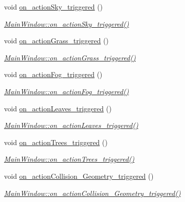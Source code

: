 \begin{DoxyCompactItemize}
void \hyperlink{class_main_window_aa4301fd4cad1597fad079ee7eebbd14a}{on\+\_\+action\+Sky\+\_\+triggered} ()
\begin{DoxyCompactList}\small\item\em \hyperlink{class_main_window_aa4301fd4cad1597fad079ee7eebbd14a}{Main\+Window\+::on\+\_\+action\+Sky\+\_\+triggered()} \end{DoxyCompactList}\item 
void \hyperlink{class_main_window_ac2ff07ecfb39bbcd9f863693bd3bb146}{on\+\_\+action\+Grass\+\_\+triggered} ()
\begin{DoxyCompactList}\small\item\em \hyperlink{class_main_window_ac2ff07ecfb39bbcd9f863693bd3bb146}{Main\+Window\+::on\+\_\+action\+Grass\+\_\+triggered()} \end{DoxyCompactList}\item 
void \hyperlink{class_main_window_af815e187182d6f7ccfb7264814a128f9}{on\+\_\+action\+Fog\+\_\+triggered} ()
\begin{DoxyCompactList}\small\item\em \hyperlink{class_main_window_af815e187182d6f7ccfb7264814a128f9}{Main\+Window\+::on\+\_\+action\+Fog\+\_\+triggered()} \end{DoxyCompactList}\item 
void \hyperlink{class_main_window_a6ef9945ba6ef944e564436d94b643c1c}{on\+\_\+action\+Leaves\+\_\+triggered} ()
\begin{DoxyCompactList}\small\item\em \hyperlink{class_main_window_a6ef9945ba6ef944e564436d94b643c1c}{Main\+Window\+::on\+\_\+action\+Leaves\+\_\+triggered()} \end{DoxyCompactList}\item 
void \hyperlink{class_main_window_ab29f6867e27f4f7bbb30eb31d7a152d2}{on\+\_\+action\+Trees\+\_\+triggered} ()
\begin{DoxyCompactList}\small\item\em \hyperlink{class_main_window_ab29f6867e27f4f7bbb30eb31d7a152d2}{Main\+Window\+::on\+\_\+action\+Trees\+\_\+triggered()} \end{DoxyCompactList}\item 
void \hyperlink{class_main_window_a26f1dd43b9b49ddc65d8e6a0ab7f2b6b}{on\+\_\+action\+Collision\+\_\+\+Geometry\+\_\+triggered} ()
\begin{DoxyCompactList}\small\item\em \hyperlink{class_main_window_a26f1dd43b9b49ddc65d8e6a0ab7f2b6b}{Main\+Window\+::on\+\_\+action\+Collision\+\_\+\+Geometry\+\_\+triggered()} \end{DoxyCompactList}\item 

\end{DoxyCompactItemize}
